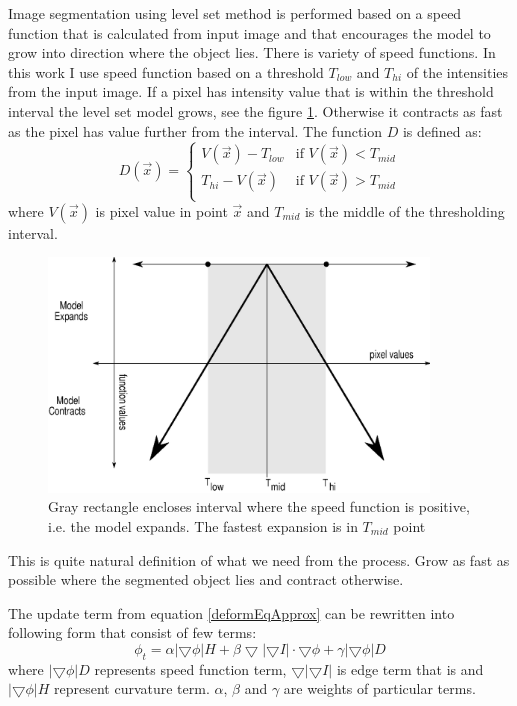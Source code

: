 Image segmentation using level set method is performed based on a speed function that is calculated from input image and that encourages the model to grow into direction where the object lies.
There is variety of speed functions.
In this work I use speed function based on a threshold $T_{low}$ and $T_{hi}$ of the intensities from the input image.
If a pixel has intensity value that is within the threshold interval the level set model grows, see the figure \ref{fg:speedFunction}.
Otherwise it contracts as fast as the pixel has value further from the interval.
The function $D$ is defined as:
\begin{equation}
\label{eq:speedFunction}
D(\vec{x}) =
\begin{cases}
V(\vec{x}) - T_{low} & \text{if $V(\vec{x}) < T_{mid}$}\\
T_{hi} - V(\vec{x}) & \text{if $V(\vec{x}) > T_{mid}$}\\
\end{cases}
\end{equation}
where $V(\vec{x})$ is pixel value in point $\vec{x}$ and $T_{mid}$ is the middle of the thresholding interval.

\begin{figure}
    \centering
    \includegraphics[width=0.9\textwidth]{data/speedFunction}
    \caption[Graph of thresholding based speed function]
    {
      Gray rectangle encloses interval where the speed function is positive, i.e. the model expands.
      The fastest expansion is in $T_{mid}$ point
    }
    \label{fg:speedFunction}
\end{figure}

This is quite natural definition of what we need from the process.
Grow as fast as possible where the segmented object lies and contract otherwise.

The update term from equation \ref{deformEqApprox} can be rewritten into following form that consist of few terms:
\begin{equation}
\phi_t = \alpha |\bigtriangledown \phi| H + \beta
\bigtriangledown|\bigtriangledown I|\cdot \bigtriangledown \phi +
\gamma|\bigtriangledown \phi|D
\end{equation}
where $|\bigtriangledown \phi|D$ represents speed function term, $\bigtriangledown|\bigtriangledown I|$ is edge term that is and $|\bigtriangledown \phi| H$ represent curvature term. $\alpha$, $\beta$ and $\gamma$ are weights of particular terms.


